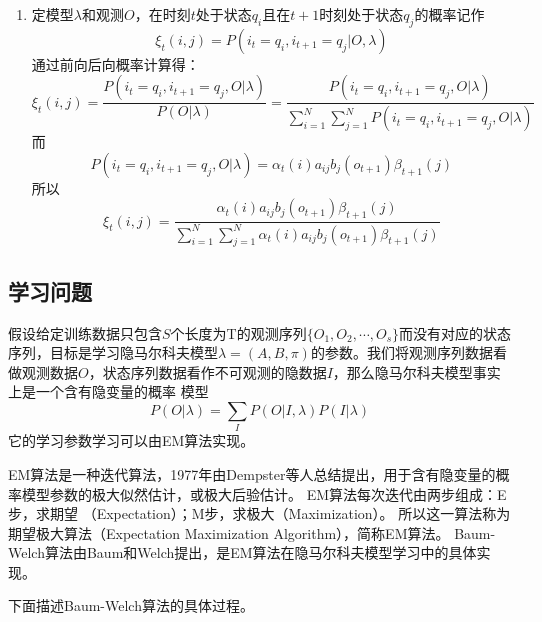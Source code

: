 \begin{enumerate}
            \item 定模型$\lambda $和观测$O$，在时刻$t$处于状态$q_i$且在$t+1$时刻处于状态$q_j$的概率记作
                \begin{equation}
                    {\xi _t}(i,j) = P({i_t} = {q_i},{i_{t + 1}} = {q_j}|O,\lambda )
                \end{equation}
                通过前向后向概率计算得：
                \[{\xi _t}(i,j) = \frac{{P({i_t} = {q_i},{i_{t + 1}} = {q_j},O|\lambda )}}{{P(O|\lambda )}} = \frac{{P({i_t} = {q_i},{i_{t + 1}} = {q_j},O|\lambda )}}{{\sum\limits_{i = 1}^N {\sum\limits_{j = 1}^N {P({i_t} = {q_i},{i_{t + 1}} = {q_j},O|\lambda )} } }}\]
                而
                \[P({i_t} = {q_i},{i_{t + 1}} = {q_j},O|\lambda ) = {\alpha _t}(i){a_{ij}}{b_j}({o_{t + 1}}){\beta _{t + 1}}(j)\]
                所以
                \begin{equation}\label{equation:xi}
                {\xi _t}(i,j) = \frac{{{\alpha _t}(i){a_{ij}}{b_j}({o_{t + 1}}){\beta _{t + 1}}(j)}}{{\sum\limits_{i = 1}^N {\sum\limits_{j = 1}^N {{\alpha _t}(i){a_{ij}}{b_j}({o_{t + 1}}){\beta _{t + 1}}(j)} } }}
                \end{equation}
        \end{enumerate}
    \subsection{学习问题}\label{section:learn}
        假设给定训练数据只包含$S$个长度为T的观测序列$\{ {O_1},{O_2}, \cdots ,{O_s}\} $而没有对应的状态序列，目标是学习隐马尔科夫模型$\lambda  = \left( {A,B,\pi } \right)$的参数。我们将观测序列数据看做观测数据$O$，状态序列数据看作不可观测的隐数据$I$，那么隐马尔科夫模型事实上是一个含有隐变量的概率
        模型
        \begin{equation}
        P(O|\lambda ) = \sum\limits_I {P(O|I,\lambda )P(I|\lambda )}
        \end{equation}
        它的学习参数学习可以由EM算法实现。

        EM算法是一种迭代算法，1977年由Dempster等人总结提出，用于含有隐变量的概率模型参数的极大似然估计，或极大后验估计。
        EM算法每次迭代由两步组成：E步，求期望
        （Expectation）；M步，求极大（Maximization）。
        所以这一算法称为期望极大算法（Expectation Maximization Algorithm），简称EM算法。
        Baum-Welch算法由Baum和Welch提出，是EM算法在隐马尔科夫模型学习中的具体实现。

        下面描述Baum-Welch算法的具体过程。


